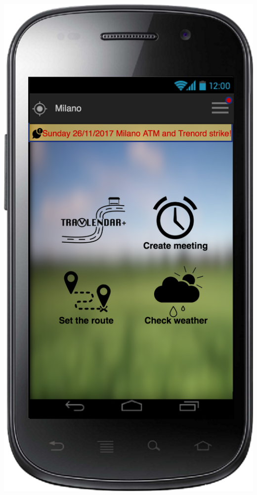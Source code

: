 \documentclass[a4paper,leqno]{article}
\begin{document}
\begin{minipage}[!t]{.5\linewidth}
	\begin{center}
	\includegraphics[scale = 0.15]{mainPage.png}
	\end{center}
\end{minipage}
\end{document}

